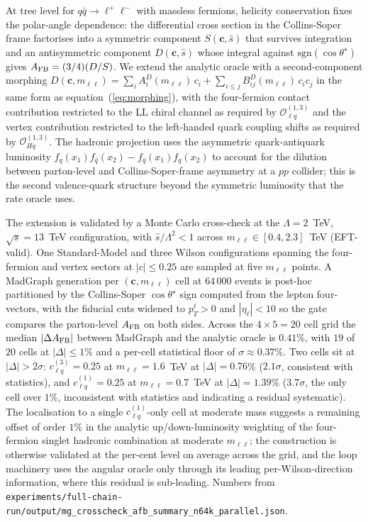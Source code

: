 \documentclass[11pt,a4paper]{article}
\newcommand{\Lam}{\Lambda}
\newcommand{\mll}{m_{\ell\ell}}
\begin{document}
At tree level for $q\bar q \to \ell^+\ell^-$ with massless fermions, helicity conservation fixes the polar-angle dependence: the differential cross section in the Collins-Soper frame factorises into a symmetric component $S(\bm{c}, \hat{s})$ that survives integration and an antisymmetric component $D(\bm{c}, \hat{s})$ whose integral against $\mathrm{sgn}(\cos\theta^\star)$ gives $A_{\rm FB} = (3/4)(D/S)$. We extend the analytic oracle with a second-component morphing $D(\bm{c}, \mll) = \sum_i A_i^D(\mll)\,c_i + \sum_{i\leq j} B_{ij}^D(\mll)\,c_i c_j$ in the same form as equation~(\ref{eq:morphing}), with the four-fermion contact contribution restricted to the LL chiral channel as required by $\mathcal{O}_{\ell q}^{(1,3)}$ and the vertex contribution restricted to the left-handed quark coupling shifts as required by $\mathcal{O}_{Hq}^{(1,3)}$. The hadronic projection uses the asymmetric quark-antiquark luminosity $f_q(x_1)f_{\bar q}(x_2) - f_{\bar q}(x_1)f_q(x_2)$ to account for the dilution between parton-level and Collins-Soper-frame asymmetry at a $pp$ collider; this is the second valence-quark structure beyond the symmetric luminosity that the rate oracle uses.

The extension is validated by a Monte Carlo cross-check at the $\Lam = 2$~TeV, $\sqrt{s} = 13$~TeV configuration, with $\hat{s}/\Lam^2 < 1$ across $\mll \in [0.4, 2.3]$~TeV (EFT-valid). One Standard-Model and three Wilson configurations spanning the four-fermion and vertex sectors at $|c| \leq 0.25$ are sampled at five $\mll$ points. A MadGraph generation per $(\bm{c}, \mll)$ cell at $64\,000$ events is post-hoc partitioned by the Collins-Soper $\cos\theta^\star$ sign computed from the lepton four-vectors, with the fiducial cuts widened to $p_T^\ell > 0$ and $|\eta_\ell| < 10$ so the gate compares the parton-level $A_{\rm FB}$ on both sides. Across the $4 \times 5 = 20$ cell grid the median $|\Delta A_{\rm FB}|$ between MadGraph and the analytic oracle is $0.41$\%, with $19$ of $20$ cells at $|\Delta| \leq 1$\% and a per-cell statistical floor of $\sigma \approx 0.37$\%. Two cells sit at $|\Delta| > 2\sigma$: $c_{\ell q}^{(3)} = 0.25$ at $\mll = 1.6$~TeV at $|\Delta| = 0.76$\% ($2.1\sigma$, consistent with statistics), and $c_{\ell q}^{(1)} = 0.25$ at $\mll = 0.7$~TeV at $|\Delta| = 1.39$\% ($3.7\sigma$, the only cell over $1\%$, inconsistent with statistics and indicating a residual systematic). The localisation to a single $c_{\ell q}^{(1)}$-only cell at moderate mass suggests a remaining offset of order $1$\% in the analytic up/down-luminosity weighting of the four-fermion singlet hadronic combination at moderate $\mll$; the construction is otherwise validated at the per-cent level on average across the grid, and the loop machinery uses the angular oracle only through its leading per-Wilson-direction information, where this residual is sub-leading. Numbers from \texttt{experiments/full-chain-run/output/mg\_crosscheck\_afb\_summary\_n64k\_parallel.json}.
\end{document}
